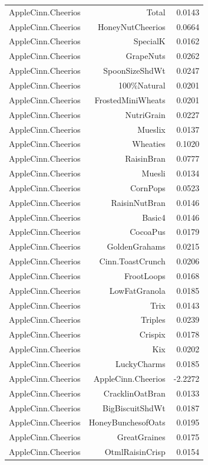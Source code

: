 \begin{longtable}{@{}lrr@{}}
AppleCinn.Cheerios & Total & 0.0143 \\
AppleCinn.Cheerios & HoneyNutCheerios & 0.0664 \\
AppleCinn.Cheerios & SpecialK & 0.0162 \\
AppleCinn.Cheerios & GrapeNuts & 0.0262 \\
AppleCinn.Cheerios & SpoonSizeShdWt & 0.0247 \\
AppleCinn.Cheerios & 100\%Natural & 0.0201 \\
AppleCinn.Cheerios & FrostedMiniWheats & 0.0201 \\
AppleCinn.Cheerios & NutriGrain & 0.0227 \\
AppleCinn.Cheerios & Mueslix & 0.0137 \\
AppleCinn.Cheerios & Wheaties & 0.1020 \\
AppleCinn.Cheerios & RaisinBran & 0.0777 \\
AppleCinn.Cheerios & Muesli & 0.0134 \\
AppleCinn.Cheerios & CornPops & 0.0523 \\
AppleCinn.Cheerios & RaisinNutBran & 0.0146 \\
AppleCinn.Cheerios & Basic4 & 0.0146 \\
AppleCinn.Cheerios & CocoaPus & 0.0179 \\
AppleCinn.Cheerios & GoldenGrahams & 0.0215 \\
AppleCinn.Cheerios & Cinn.ToastCrunch & 0.0206 \\
AppleCinn.Cheerios & FrootLoops & 0.0168 \\
AppleCinn.Cheerios & LowFatGranola & 0.0185 \\
AppleCinn.Cheerios & Trix & 0.0143 \\
AppleCinn.Cheerios & Triples & 0.0239 \\
AppleCinn.Cheerios & Crispix & 0.0178 \\
AppleCinn.Cheerios & Kix & 0.0202 \\
AppleCinn.Cheerios & LuckyCharms & 0.0185 \\
AppleCinn.Cheerios & AppleCinn.Cheerios & -2.2272 \\
AppleCinn.Cheerios & CracklinOatBran & 0.0133 \\
AppleCinn.Cheerios & BigBiscuitShdWt & 0.0187 \\
AppleCinn.Cheerios & HoneyBunchesofOats & 0.0195 \\
AppleCinn.Cheerios & GreatGraines & 0.0175 \\
AppleCinn.Cheerios & OtmlRaisinCrisp & 0.0154 \\

\end{longtable}
